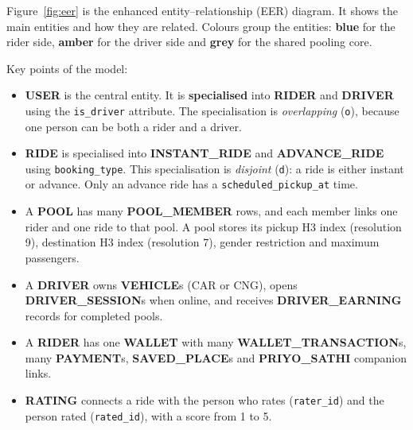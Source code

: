 Figure~\ref{fig:eer} is the enhanced entity--relationship (EER) diagram. It
shows the main entities and how they are related. Colours group the entities:
\textbf{blue} for the rider side, \textbf{amber} for the driver side and
\textbf{grey} for the shared pooling core.

Key points of the model:

\begin{itemize}
  \item \textbf{USER} is the central entity. It is \textbf{specialised} into
        \textbf{RIDER} and \textbf{DRIVER} using the \texttt{is\_driver}
        attribute. The specialisation is \emph{overlapping} (\texttt{o}),
        because one person can be both a rider and a driver.
  \item \textbf{RIDE} is specialised into \textbf{INSTANT\_RIDE} and
        \textbf{ADVANCE\_RIDE} using \texttt{booking\_type}. This
        specialisation is \emph{disjoint} (\texttt{d}): a ride is either
        instant or advance. Only an advance ride has a
        \texttt{scheduled\_pickup\_at} time.
  \item A \textbf{POOL} has many \textbf{POOL\_MEMBER} rows, and each member
        links one rider and one ride to that pool. A pool stores its pickup H3
        index (resolution 9), destination H3 index (resolution 7), gender
        restriction and maximum passengers.
  \item A \textbf{DRIVER} owns \textbf{VEHICLE}s (CAR or CNG), opens
        \textbf{DRIVER\_SESSION}s when online, and receives
        \textbf{DRIVER\_EARNING} records for completed pools.
  \item A \textbf{RIDER} has one \textbf{WALLET} with many
        \textbf{WALLET\_TRANSACTION}s, many \textbf{PAYMENT}s,
        \textbf{SAVED\_PLACE}s and \textbf{PRIYO\_SATHI} companion links.
  \item \textbf{RATING} connects a ride with the person who rates
        (\texttt{rater\_id}) and the person rated (\texttt{rated\_id}), with a
        score from 1 to 5.
\end{itemize}

